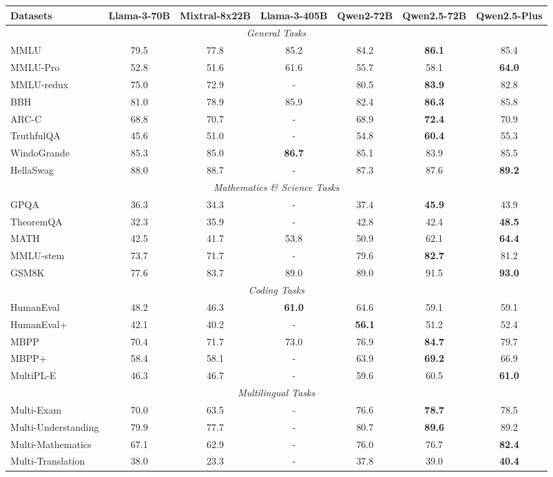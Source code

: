 \documentclass{article}
\begin{document}
\begin{table}[tbp]
\begin{tabular}{@{}lcccccc@{}}
\toprule
\textbf{Datasets} & \textbf{Llama-3-70B} & \textbf{Mixtral-8x22B} & \textbf{Llama-3-405B} & \textbf{Qwen2-72B} & \textbf{Qwen2.5-72B} & \textbf{Qwen2.5-Plus} \\
\midrule
\multicolumn{7}{c}{\textit{General Tasks}} \\
\midrule
MMLU & 79.5 & 77.8 & 85.2 & 84.2 & \textbf{86.1} & 85.4 \\
MMLU-Pro & 52.8 & 51.6 & 61.6 & 55.7 & 58.1 & \textbf{64.0} \\
MMLU-redux & 75.0 & 72.9 & - & 80.5 & \textbf{83.9} & 82.8 \\
BBH & 81.0 & 78.9 & 85.9 & 82.4 & \textbf{86.3} & 85.8 \\
ARC-C & 68.8 & 70.7 & - & 68.9 & \textbf{72.4} & 70.9 \\
TruthfulQA & 45.6 & 51.0 & - & 54.8 & \textbf{60.4} & 55.3 \\
WindoGrande & 85.3 & 85.0 & \textbf{86.7} & 85.1 & 83.9 & 85.5 \\
HellaSwag & 88.0 & 88.7 & - & 87.3 & 87.6 & \textbf{89.2} \\
\midrule
\multicolumn{7}{c}{\textit{Mathematics \& Science Tasks}} \\
\midrule
GPQA & 36.3 & 34.3 & - & 37.4 & \textbf{45.9} & 43.9\\
TheoremQA & 32.3 & 35.9 & - & 42.8 & 42.4 & \textbf{48.5} \\
MATH & 42.5 & 41.7 & 53.8 & 50.9 & 62.1 & \textbf{64.4} \\
MMLU-stem & 73.7 & 71.7 & - & 79.6 & \textbf{82.7} & 81.2 \\
GSM8K & 77.6 & 83.7 & 89.0 & 89.0 & 91.5 & \textbf{93.0} \\
\midrule
\multicolumn{7}{c}{\textit{Coding Tasks}} \\
\midrule
HumanEval & 48.2 & 46.3 & \textbf{61.0} & 64.6 & 59.1 & 59.1 \\
HumanEval+ & 42.1 & 40.2 & - & \textbf{56.1} & 51.2 & 52.4\\
MBPP & 70.4 & 71.7 & 73.0 & 76.9 & \textbf{84.7} & 79.7\\
MBPP+ & 58.4 & 58.1 & - & 63.9 & \textbf{69.2} & 66.9 \\
MultiPL-E & 46.3 & 46.7 & - & 59.6 & 60.5 & \textbf{61.0} \\
\midrule
\multicolumn{7}{c}{\textit{Multilingual Tasks}} \\
\midrule
Multi-Exam & 70.0 & 63.5 & - & 76.6 & \textbf{78.7} & 78.5 \\
Multi-Understanding & 79.9 & 77.7 & - & 80.7 & \textbf{89.6} & 89.2 \\
Multi-Mathematics & 67.1 & 62.9 & - & 76.0 & 76.7 & \textbf{82.4} \\
Multi-Translation & 38.0 & 23.3 & - & 37.8 & 39.0 & \textbf{40.4} \\
\bottomrule
\end{tabular}
\end{table}
\end{document}

